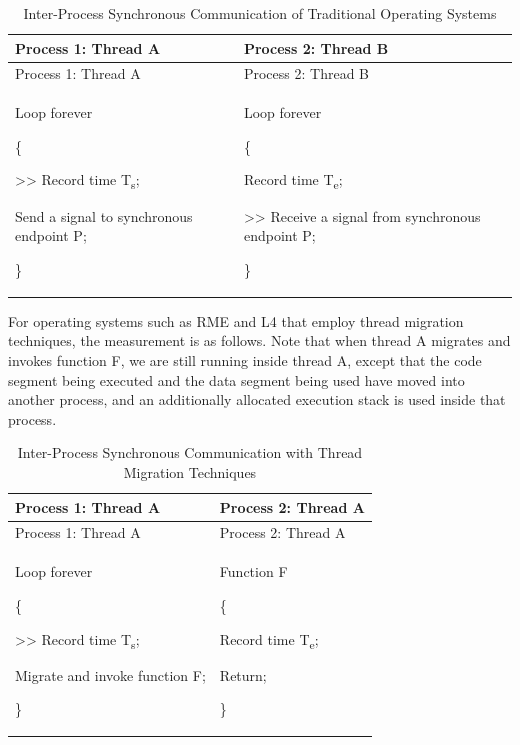 \begin{xltabular}{\textwidth}{@{}>{\hsize\raggedright\arraybackslash}X>{\hsize\raggedright\arraybackslash}X@{}}
\caption{Inter-Process Synchronous Communication of Traditional Operating Systems}\label{tab:1-6-inter-process-sync-communication}\\
\toprule
Process 1: Thread A & Process 2: Thread B\tabularnewline
\endfirsthead
\toprule
Process 1: Thread A & Process 2: Thread B\tabularnewline
\midrule
\endhead
\bottomrule
\endlastfoot
Loop forever

\{

\textgreater\textgreater{} Record time T\textsubscript{s};

Send a signal to synchronous endpoint P;

\}\strut
 & Loop forever

\{

Record time T\textsubscript{e};

\textgreater\textgreater{} Receive a signal from synchronous endpoint P;

\}\strut
\tabularnewline
\end{xltabular}
\nopagebreak[4]

For operating systems such as RME and L4 that employ thread migration techniques, the measurement is as follows. Note that when thread A migrates and invokes function F, we are still running inside thread A, except that the code segment being executed and the data segment being used have moved into another process, and an additionally allocated execution stack is used inside that process.

\begin{xltabular}{\textwidth}{@{}>{\hsize\raggedright\arraybackslash}X>{\hsize\raggedright\arraybackslash}X@{}}
\caption{Inter-Process Synchronous Communication with Thread Migration Techniques}\label{tab:1-7-thread-migration-sync-communication}\\
\toprule
Process 1: Thread A & Process 2: Thread A\tabularnewline
\endfirsthead
\toprule
Process 1: Thread A & Process 2: Thread A\tabularnewline
\midrule
\endhead
\bottomrule
\endlastfoot
Loop forever

\{

\textgreater\textgreater{} Record time T\textsubscript{s};

Migrate and invoke function F;

\}\strut
 & Function F

\{

Record time T\textsubscript{e};

Return;

\}\strut
\tabularnewline
\end{xltabular}
\nopagebreak[4]

